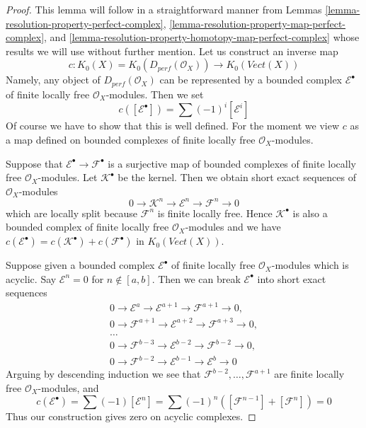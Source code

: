 \documentclass{stacks-project}
\theoremstyle{plain}
\theoremstyle{definition}
\theoremstyle{remark}
\numberwithin{equation}{subsection}
\begin{document}
\begin{proof}
This lemma will follow in a straightforward manner from
Lemmas \ref{lemma-resolution-property-perfect-complex},
\ref{lemma-resolution-property-map-perfect-complex}, and
\ref{lemma-resolution-property-homotopy-map-perfect-complex}
whose results we will use without further mention.
Let us construct an inverse map
$$
c : K_0(X) = K_0(D_{perf}(\mathcal{O}_X)) \longrightarrow
K_0(\textit{Vect}(X))
$$
Namely, any object of $D_{perf}(\mathcal{O}_X)$ can be represented
by a bounded complex $\mathcal{E}^\bullet$ of finite locally free
$\mathcal{O}_X$-modules. Then we set
$$
c([\mathcal{E}^\bullet]) = \sum (-1)^i[\mathcal{E}^i]
$$
Of course we have to show that this is well defined. For the moment
we view $c$ as a map defined on bounded complexes of finite locally free
$\mathcal{O}_X$-modules.

\medskip\noindent
Suppose that $\mathcal{E}^\bullet \to \mathcal{F}^\bullet$ is a surjective map
of bounded complexes of finite locally free $\mathcal{O}_X$-modules.
Let $\mathcal{K}^\bullet$ be the kernel. Then we obtain short exact
sequences of $\mathcal{O}_X$-modules
$$
0 \to \mathcal{K}^n \to \mathcal{E}^n \to \mathcal{F}^n \to 0
$$
which are locally split because $\mathcal{F}^n$ is finite locally free.
Hence $\mathcal{K}^\bullet$ is also a bounded complex of finite
locally free $\mathcal{O}_X$-modules and we have
$c(\mathcal{E}^\bullet) = c(\mathcal{K}^\bullet) + c(\mathcal{F}^\bullet)$
in $K_0(\textit{Vect}(X))$.

\medskip\noindent
Suppose given a bounded complex $\mathcal{E}^\bullet$
of finite locally free $\mathcal{O}_X$-modules which is acyclic.
Say $\mathcal{E}^n = 0$ for $n \not \in [a, b]$. Then we
can break $\mathcal{E}^\bullet$ into short exact sequences
$$
\begin{matrix}
0 \to \mathcal{E}^a \to \mathcal{E}^{a + 1} \to \mathcal{F}^{a + 1} \to 0,\\
0 \to \mathcal{F}^{a + 1} \to \mathcal{E}^{a + 2} \to
\mathcal{F}^{a + 3} \to 0, \\
\ldots \\
0 \to \mathcal{F}^{b - 3} \to \mathcal{E}^{b - 2} \to
\mathcal{F}^{b - 2} \to 0, \\
0 \to \mathcal{F}^{b - 2} \to \mathcal{E}^{b - 1} \to \mathcal{E}^b \to 0
\end{matrix}
$$
Arguing by descending induction we see that
$\mathcal{F}^{b - 2}, \ldots, \mathcal{F}^{a + 1}$
are finite locally free $\mathcal{O}_X$-modules, and
$$
c(\mathcal{E}^\bullet) = \sum (-1)[\mathcal{E}^n] =
\sum (-1)^n([\mathcal{F}^{n - 1}] + [\mathcal{F}^n]) = 0
$$
Thus our construction gives zero on acyclic complexes.


\end{proof}
\end{document}

